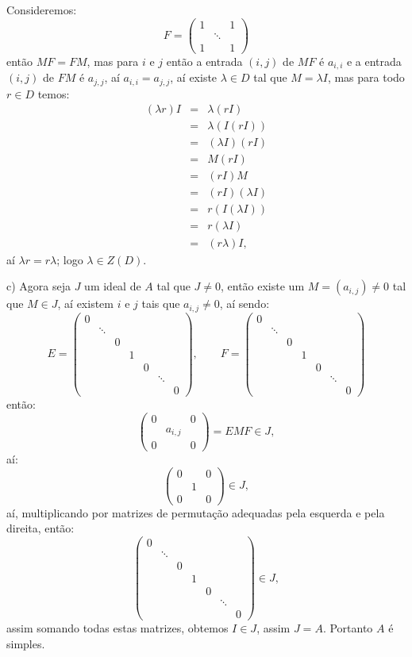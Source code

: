 \documentclass[10pt,a4paper]{article}
\begin{document}
\medskip
\noindent
Consideremos:
\[
F=\begin{pmatrix}
1&&1\\&\ddots&\\1&&1
\end{pmatrix}
\]
então $MF=FM$, mas para $i$ e $j$ então a entrada $(i,j)$ de $MF$ é $a_{i,i}$ e a entrada $(i,j)$ de $FM$ é $a_{j,j}$, aí $a_{i,i}=a_{j,j}$, aí existe $\lambda\in D$ tal que $M=\lambda I$, mas para todo $r\in D$ temos:
\[
\begin{array}{rcl}
(\lambda r)I&=&\lambda(rI)\\&=&\lambda(I(rI))\\&=&(\lambda I)(rI)\\&=&M(rI)\\&=&(rI)M\\&=&(rI)(\lambda I)\\&=&r(I(\lambda I))\\&=&r(\lambda I)\\&=&(r\lambda)I,
\end{array}
\]
aí $\lambda r=r\lambda$; logo $\lambda\in Z(D)$.

\medskip
\noindent
c) Agora seja $J$ um ideal de $A$ tal que $J\neq0$, então existe um $M=(a_{i,j})\neq 0$ tal que $M\in J$, aí existem $i$ e $j$ tais que $a_{i,j}\neq 0$, aí sendo:
\[
E=\begin{pmatrix}
0&&&&&&\\&\ddots&&&&&\\&&0&&&&\\&&&1&&&\\&&&&0&&\\&&&&&\ddots&\\&&&&&&0
\end{pmatrix},\quad\quad
F=\begin{pmatrix}
0&&&&&&\\&\ddots&&&&&\\&&0&&&&\\&&&1&&&\\&&&&0&&\\&&&&&\ddots&\\&&&&&&0
\end{pmatrix}
\]
então:
\[
\begin{pmatrix}
0&&0\\&a_{i,j}&\\0&&0
\end{pmatrix}
=EMF\in J,
\]
aí:
\[
\begin{pmatrix}
0&&0\\&1&\\0&&0
\end{pmatrix}
\in J,
\]
aí, multiplicando por matrizes de permutação adequadas pela esquerda e pela direita, então:
\[
\begin{pmatrix}
0&&&&&&\\&\ddots&&&&&\\&&0&&&&\\&&&1&&&\\&&&&0&&\\&&&&&\ddots&\\&&&&&&0
\end{pmatrix}
\in J,
\]
assim somando todas estas matrizes, obtemos $I\in J$, assim $J=A$. Portanto $A$ é simples.
\end{document}

